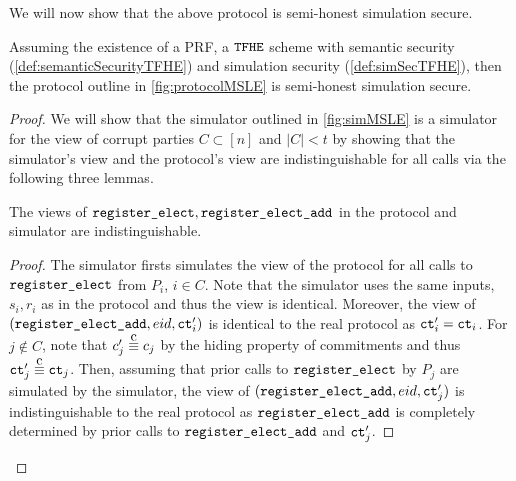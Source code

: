 \newcommand{\simCMSLE}{\texttt{Sim}_C}

We will now show that the above protocol is semi-honest simulation secure.

\begin{theorem}
	Assuming the existence of a PRF, a ${\texttt{TFHE}}$ scheme with semantic security (\cref{def:semanticSecurityTFHE}) and simulation security (\cref{def:simSecTFHE}),
	then the protocol outline in \cref{fig:protocolMSLE} is semi-honest simulation secure.
	\begin{proof}
		We will show that the simulator outlined in \cref{fig:simMSLE} is a simulator for the view of corrupt
		parties $C \subset [n]$ and $|C| < t$ by showing that the simulator's view and the protocol's view are indistinguishable for all calls
		via the following three lemmas.

		\begin{lemma}
			The views of $\texttt{register\_elect}, \texttt{register\_elect\_add}$ in the protocol and simulator are indistinguishable.
			\begin{proof}
				The simulator firsts simulates the view of the protocol for all calls to $\texttt{register\_elect}$ from $P_i$, $i \in C$.
				Note that the simulator uses the same inputs, $s_i, r_i$ as in the protocol and thus the view is identical.
				Moreover, the view of $(\texttt{register\_elect\_add}, {eid}, \texttt{ct}'_i)$ is identical to the real protocol as $\texttt{ct}'_i = \texttt{ct}_i$.
				For $j \notin C$, note that $c'_j \compInd c_j$ by the hiding property of commitments and thus
				$\ct'_j \compInd \ct_j$.
				Then, assuming that prior calls to $\texttt{register\_elect}$ by $P_j$ are simulated by the simulator,
				the view of $(\texttt{register\_elect\_add}, {eid}, \texttt{ct}'_j)$ is indistinguishable to the real protocol as
				$\texttt{register\_elect\_add}$ is completely determined by prior calls to $\texttt{register\_elect\_add}$ and $\texttt{ct}'_j$.


\end{proof}
\end{lemma}
\end{proof}
\end{theorem}
